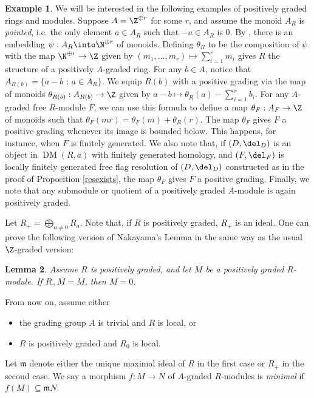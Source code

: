 \documentclass[12pt]{amsart}
\newtheorem{lemma}{Lemma}[section]
\theoremstyle{definition}
\newtheorem{example}[lemma]{Example}
\theoremstyle{remark}
\newcommand{\m}{\mathfrak m}
\def\DM{\operatorname{DM}}
\begin{document}
\begin{example}
\label{posgradingex}
We will be interested in the following examples of positively graded rings and modules. Suppose $A = \Z^{\oplus r}$ for some $r$, and assume the monoid $A_R$ is \emph{pointed}, i.e. the only element $a \in A_R$ such that $-a \in A_R$ is 0. By \cite[Corollary 7.23]{MS}, there is an embedding $\psi: A_R \into \N^{\oplus r}$ of monoids. Defining $\theta_R$ to be the composition of $\psi$ with the map $\N^{\oplus r} \to \Z$ given by $(m_1, \dots, m_r) \mapsto \sum_{i = 1}^r m_i$ gives $R$ the structure of a positively $A$-graded ring. For any $b \in A$, notice that
$A_{R(b)} = \{a - b \text{ : } a \in A_R\}$. We equip $R(b)$ with a positive grading via the map of monoids $\theta_{R(b)} : A_{R(b)} \to \Z$ given by $a - b \mapsto \theta_R(a) - \sum_{i = 1}^r b_i$. For any $A$-graded free $R$-module $F$, we can use this formula to define a map $\theta_F : A_F \to \Z$ of monoids such that $\theta_F(mr) =\theta_F(m) +  \theta_R(r)$. The map $\theta_F$ gives $F$ a positive grading whenever its image is bounded below. This happens, for instance, when $F$ is finitely generated. We also note that, if $(D, \del_D)$ is an object in $\DM(R, a)$ with finitely generated homology, and $(F, \del_F)$ is locally finitely generated free flag resolution of $(D, \del_D)$ constructed as in the proof of Proposition \ref{resexists}, the map $\theta_F$ gives $F$ a positive grading. Finally, we note that any submodule or quotient of a positively graded $A$-module is again positively graded. 
\end{example}



Let $R_+ = \bigoplus_{a \ne 0} R_a$. Note that, if $R$ is positively graded, $R_+$ is an ideal. One can prove the following version of Nakayama's Lemma in the same way as the usual $\Z$-graded version:

\begin{lemma}
Assume $R$ is positively graded, and let $M$ be a positively graded $R$-module. If $R_+ M = M$, then $M = 0$.
\end{lemma}

From now on, assume either
\begin{itemize}
\item[(1)] the grading group $A$ is trivial and $R$ is local, or
\item[(2)] $R$ is positively graded and $R_0$ is local.
\end{itemize}
Let $\m$ denote either the unique maximal ideal of $R$ in the first case or $R_+$ in the second case. We say a morphism $f : M \to N$ of $A$-graded $R$-modules is \emph{minimal} if $f(M) \subseteq \m N$.
\end{document}
